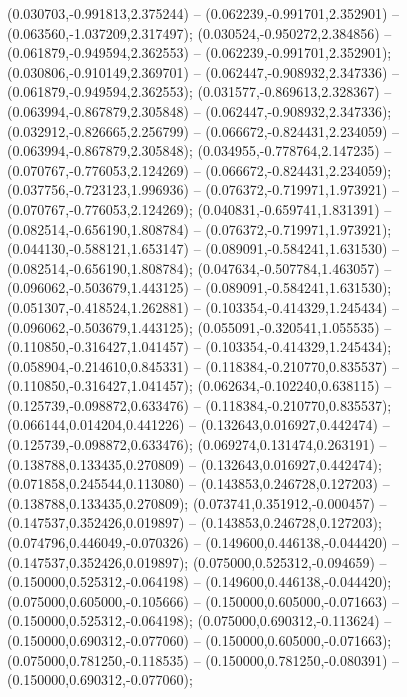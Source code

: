  (0.030703,-0.991813,2.375244) -- (0.062239,-0.991701,2.352901) -- (0.063560,-1.037209,2.317497);
 (0.030524,-0.950272,2.384856) -- (0.061879,-0.949594,2.362553) -- (0.062239,-0.991701,2.352901);
 (0.030806,-0.910149,2.369701) -- (0.062447,-0.908932,2.347336) -- (0.061879,-0.949594,2.362553);
 (0.031577,-0.869613,2.328367) -- (0.063994,-0.867879,2.305848) -- (0.062447,-0.908932,2.347336);
 (0.032912,-0.826665,2.256799) -- (0.066672,-0.824431,2.234059) -- (0.063994,-0.867879,2.305848);
 (0.034955,-0.778764,2.147235) -- (0.070767,-0.776053,2.124269) -- (0.066672,-0.824431,2.234059);
 (0.037756,-0.723123,1.996936) -- (0.076372,-0.719971,1.973921) -- (0.070767,-0.776053,2.124269);
 (0.040831,-0.659741,1.831391) -- (0.082514,-0.656190,1.808784) -- (0.076372,-0.719971,1.973921);
 (0.044130,-0.588121,1.653147) -- (0.089091,-0.584241,1.631530) -- (0.082514,-0.656190,1.808784);
 (0.047634,-0.507784,1.463057) -- (0.096062,-0.503679,1.443125) -- (0.089091,-0.584241,1.631530);
 (0.051307,-0.418524,1.262881) -- (0.103354,-0.414329,1.245434) -- (0.096062,-0.503679,1.443125);
 (0.055091,-0.320541,1.055535) -- (0.110850,-0.316427,1.041457) -- (0.103354,-0.414329,1.245434);
 (0.058904,-0.214610,0.845331) -- (0.118384,-0.210770,0.835537) -- (0.110850,-0.316427,1.041457);
 (0.062634,-0.102240,0.638115) -- (0.125739,-0.098872,0.633476) -- (0.118384,-0.210770,0.835537);
 (0.066144,0.014204,0.441226) -- (0.132643,0.016927,0.442474) -- (0.125739,-0.098872,0.633476);
 (0.069274,0.131474,0.263191) -- (0.138788,0.133435,0.270809) -- (0.132643,0.016927,0.442474);
 (0.071858,0.245544,0.113080) -- (0.143853,0.246728,0.127203) -- (0.138788,0.133435,0.270809);
 (0.073741,0.351912,-0.000457) -- (0.147537,0.352426,0.019897) -- (0.143853,0.246728,0.127203);
 (0.074796,0.446049,-0.070326) -- (0.149600,0.446138,-0.044420) -- (0.147537,0.352426,0.019897);
 (0.075000,0.525312,-0.094659) -- (0.150000,0.525312,-0.064198) -- (0.149600,0.446138,-0.044420);
 (0.075000,0.605000,-0.105666) -- (0.150000,0.605000,-0.071663) -- (0.150000,0.525312,-0.064198);
 (0.075000,0.690312,-0.113624) -- (0.150000,0.690312,-0.077060) -- (0.150000,0.605000,-0.071663);
 (0.075000,0.781250,-0.118535) -- (0.150000,0.781250,-0.080391) -- (0.150000,0.690312,-0.077060);
